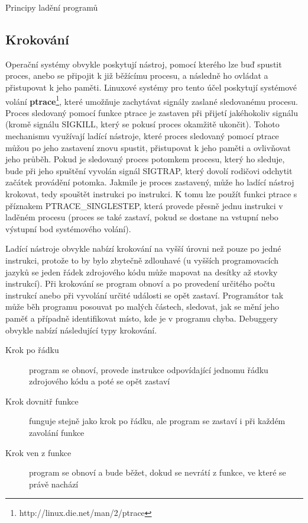 \documentclass[czech,bachelor,male,python,dept460,hidelinks]{diploma}						%
\newcommand{\parspace}[1][]{
	\ifthenelse{\isempty{#1}}{\vspace{5mm}}{\vspace{#1}}
	\par
}
\begin{document}
\begin{section}{Principy ladění programů}
	\subsection{Krokování}
		Operační systémy obvykle poskytují nástroj, pomocí kterého lze buď spustit proces, anebo se připojit k již běžícímu procesu, a následně ho ovládat
		a přistupovat k jeho paměti. Linuxové systémy pro tento účel poskytují systémové volání \textbf{ptrace}\footnote{http://linux.die.net/man/2/ptrace},
		které umožňuje zachytávat signály zaslané sledovanému procesu. Proces sledovaný pomocí funkce ptrace je zastaven při přijetí jakéhokoliv signálu
		(kromě signálu SIGKILL, který se pokusí proces okamžitě ukončit). Tohoto mechanismu využívají ladící nástroje, které proces sledovaný pomocí
		ptrace můžou po jeho zastavení znovu spustit, přistupovat k jeho paměti a ovlivňovat jeho průběh. Pokud je sledovaný proces potomkem procesu,
		který ho sleduje, bude při jeho spuštění vyvolán signál SIGTRAP, který dovolí rodičovi odchytit začátek provádění potomka. Jakmile je proces
		zastavený, může ho ladící nástroj krokovat, tedy spouštět instrukci po instrukci. K tomu lze použít funkci ptrace s příznakem PTRACE\_SINGLESTEP,
		která provede přesně jednu instrukci v laděném procesu (proces se také zastaví, pokud se dostane na vstupní nebo výstupní bod systémového volání).
		
		\parspace Ladící nástroje obvykle nabízí krokování na vyšší úrovni než pouze po jedné instrukci, protože to by bylo zbytečně zdlouhavé (u vyšších
		programovacích jazyků se jeden řádek zdrojového kódu může mapovat na desítky až stovky instrukcí).
		Při krokování se program obnoví a po provedení určitého počtu instrukcí anebo při vyvolání určité události se opět zastaví. Programátor tak může
		běh programu posouvat po malých částech, sledovat, jak se mění jeho paměť a případně identifikovat místo, kde je v programu chyba.
		Debuggery obvykle nabízí následující typy krokování.
		
		\begin{description}
			\item[Krok po řádku] program se obnoví, provede instrukce odpovídající jednomu řádku zdrojového kódu a poté se opět zastaví
			\item[Krok dovnitř funkce] funguje stejně jako krok po řádku, ale program se zastaví i při každém zavolání funkce
			\item[Krok ven z funkce] program se obnoví a bude běžet, dokud se nevrátí z funkce, ve které se právě nachází
		\end{description}
		

\end{section}
\end{document}
